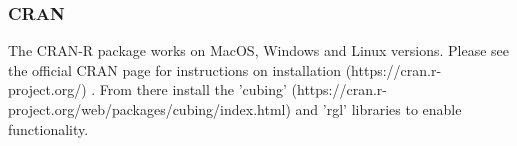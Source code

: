 \documentclass{article}
\begin{document}
\paragraph{}
\paragraph{}

\subsubsection{CRAN}
\label{CRAN}
The CRAN-R package works on MacOS, Windows and Linux versions. Please see the official CRAN page for instructions on installation (https://cran.r-project.org/) . From there install the 'cubing' (https://cran.r-project.org/web/packages/cubing/index.html) and 'rgl' libraries to enable functionality.

\newpage

%
\printbibliography
\end{document}
